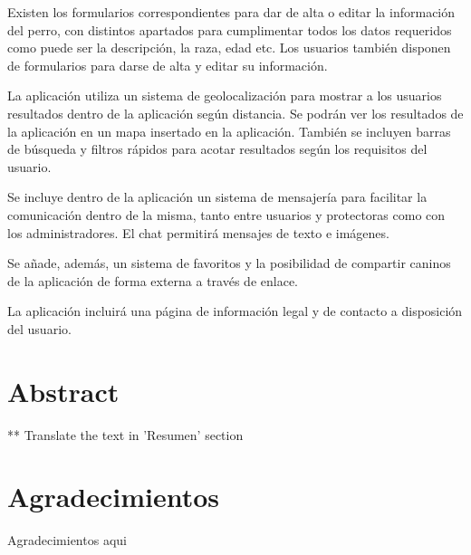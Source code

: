 \documentclass[a4paper, 12pt]{article}
\begin{document}
Existen los formularios correspondientes para dar de alta o editar la información del perro, con distintos apartados para cumplimentar todos los datos requeridos como puede ser la descripción, la raza, edad etc. Los usuarios también disponen de formularios para darse de alta y editar su información.

La aplicación utiliza un sistema de geolocalización para mostrar a los usuarios resultados dentro de la aplicación según distancia. Se podrán ver los resultados de la aplicación en un mapa insertado en la aplicación. También se incluyen barras de búsqueda y filtros rápidos para acotar resultados según los requisitos del usuario.

Se incluye dentro de la aplicación un sistema de mensajería para facilitar la comunicación dentro de la misma, tanto entre usuarios y protectoras como con los administradores. El chat permitirá mensajes de texto e imágenes.

Se añade, además, un sistema de favoritos y la posibilidad de compartir caninos de la aplicación de forma externa a través de enlace. 

La aplicación incluirá una página de información legal y de contacto a disposición del usuario.


\newpage
\pagestyle{plain}
\thispagestyle{empty}
\mbox{}

\newpage
\section*{Abstract}
** Translate the text in 'Resumen' section

\newpage
\thispagestyle{empty}
\mbox{}

\newpage
\section*{Agradecimientos}
\begin{center} 
\vspace*{\fill}
Agradecimientos aqui
\vspace*{\fill}
\end{center} 

\newpage
\thispagestyle{empty}
\mbox{}
\newpage
\thispagestyle{empty}
\mbox{}

\tableofcontents
\listoftables
\listoffigures

\newpage
\thispagestyle{empty}
\mbox{}
\end{document}
